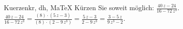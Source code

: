 \begin{MAufgabe}{Kuerzen}{kr, dh, MaTeX}
K\"urzen Sie soweit m\"oglich: $\frac{40\, z - 24}{16 - 72\, z^3}$.\\ 
\ifLsg\MLoesung
\quad $\frac{40\, z - 24}{16 - 72\, z^3}=\frac{(8)\cdot(5\, z - 3)}{(8)\cdot(2 - 9\, z^3)}=\frac{5\, z - 3}{2 - 9\, z^3}=\frac{3 - 5\, z}{9\, z^3 - 2}$.\else\relax\fi
 \end{MAufgabe}